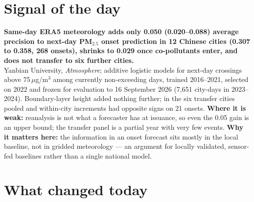 \documentclass[10pt]{article}
\begin{document}
\vspace{6mm}

\section*{\sffamily\bfseries\color{Deep}Signal of the day}
\vspace{-1.5mm}{\color{Amber}\rule{\linewidth}{1.1pt}}\vspace{2.5mm}

\begin{keybox}
{\sffamily\bfseries\small\color{Deep}Same-day ERA5 meteorology adds only 0.050 (0.020--0.088) average precision to next-day PM$_{2.5}$ onset prediction in 12 Chinese cities (0.307 to 0.358, 268 onsets), shrinks to 0.029 once co-pollutants enter, and does not transfer to six further cities.}\\[1.4mm]
\footnotesize
Yanbian University, \textit{Atmosphere}; additive logistic models for next-day crossings above 75\,$\mu$g/m$^3$ among currently non-exceeding days, trained 2016--2021, selected on 2022 and frozen for evaluation to 16 September 2026 (7,651 city-days in 2023--2024). Boundary-layer height added nothing further; in the six transfer cities pooled and within-city increments had opposite signs on 21 onsets.
\textbf{Where it is weak:} reanalysis is not what a forecaster has at issuance, so even the 0.05 gain is an upper bound; the transfer panel is a partial year with very few events.
\textbf{Why it matters here:} the information in an onset forecast sits mostly in the local baseline, not in gridded meteorology --- an argument for locally validated, sensor-fed baselines rather than a single national model.\par
\end{keybox}

\vspace{3mm}

\section*{\sffamily\bfseries\color{Deep}What changed today}
\vspace{-1.5mm}{\color{Amber}\rule{\linewidth}{1.1pt}}\vspace{2.5mm}
\end{document}
